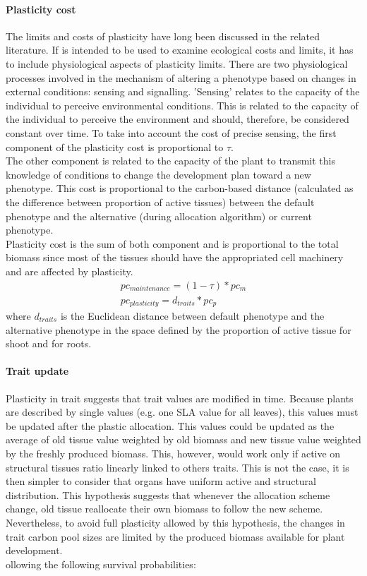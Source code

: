 \paragraph{Plasticity cost}
The limits and costs of plasticity have long been discussed in the related literature. If \model is intended to be used to examine ecological costs and limits, it has to include physiological aspects of plasticity limits. There are two physiological processes involved in the mechanism of altering a phenotype based on changes in external conditions: sensing and signalling. 'Sensing' relates to the capacity of the individual to perceive environmental conditions. This is related to the capacity of the individual to perceive the environment and should, therefore, be considered constant over time. To take into account the cost of precise sensing, the first component of the plasticity cost is proportional to $\tau$.\\
The other component is related to the capacity of the plant to transmit this knowledge of conditions to change the development plan toward a new phenotype. This cost is proportional to the carbon-based distance (calculated as the difference between proportion of active tissues) between the default phenotype and the alternative (during allocation algorithm) or current phenotype.\\
Plasticity cost is the sum of both component and is proportional to the total biomass since most of the tissues should have the appropriated cell machinery and are affected by plasticity.
\begin{align}
pc_{maintenance} = (1 - \tau) * pc_m \\
pc_{plasticity} = d_{traits} * pc_p
\end{align}
where $d_{traits}$ is the Euclidean distance between default phenotype and the alternative phenotype in the space defined by the proportion of active tissue for shoot and for roots.

\paragraph{Trait update}
Plasticity in trait suggests that trait values are modified in time. Because plants are described by single values (e.g. one SLA value for all leaves), this values must be updated after the plastic allocation. This values could be updated as the average of old tissue value weighted by old biomass and new tissue value weighted by the freshly produced biomass. This, however, would work only if active on structural tissues ratio linearly linked to others traits. This is not the case, it is then simpler to consider that organs have uniform active and structural distribution. This hypothesis suggests that whenever the allocation scheme change, old tissue reallocate their own biomass to follow the new scheme. Nevertheless, to avoid full plasticity allowed by this hypothesis, the changes in trait carbon pool sizes are limited by the produced biomass available for plant development.\\ollowing the following survival probabilities:


